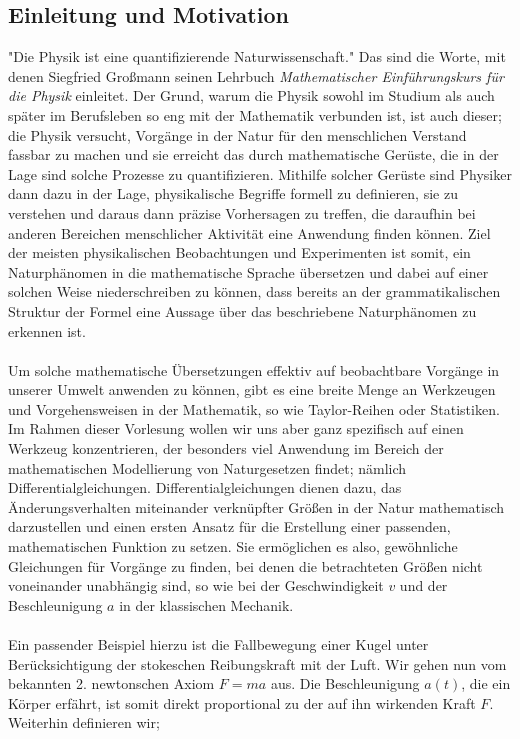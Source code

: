 \documentclass[a4paper,11pt]{article}
\theoremstyle{remark}
\begin{document}
\subsection{Einleitung und Motivation}
"Die Physik ist eine quantifizierende Naturwissenschaft." Das sind die Worte, mit denen Siegfried Großmann \cite{1} seinen Lehrbuch \textit{Mathematischer Einführungskurs für die Physik} einleitet. Der Grund, warum die Physik sowohl im Studium als auch später im Berufsleben so eng mit der Mathematik verbunden ist, ist auch dieser; die Physik versucht, Vorgänge in der Natur für den menschlichen Verstand fassbar zu machen und sie erreicht das durch mathematische Gerüste, die in der Lage sind solche Prozesse zu quantifizieren. Mithilfe solcher Gerüste sind Physiker dann dazu in der Lage, physikalische Begriffe formell zu definieren, sie zu verstehen und daraus dann präzise Vorhersagen zu treffen, die daraufhin bei anderen Bereichen menschlicher Aktivität eine Anwendung finden können. Ziel der meisten physikalischen Beobachtungen und Experimenten ist somit, ein Naturphänomen in die mathematische Sprache übersetzen und dabei auf einer solchen Weise niederschreiben zu können, dass bereits an der grammatikalischen Struktur der Formel eine Aussage über das beschriebene Naturphänomen zu erkennen ist. \\ \\ Um solche mathematische Übersetzungen effektiv auf beobachtbare Vorgänge in unserer Umwelt anwenden zu können, gibt es eine breite Menge an Werkzeugen und Vorgehensweisen in der Mathematik, so wie Taylor-Reihen oder Statistiken. Im Rahmen dieser Vorlesung wollen wir uns aber ganz spezifisch auf einen Werkzeug konzentrieren, der besonders viel Anwendung im Bereich der mathematischen Modellierung von Naturgesetzen findet; nämlich Differentialgleichungen. Differentialgleichungen dienen dazu, das Änderungsverhalten miteinander verknüpfter Größen in der Natur mathematisch darzustellen und einen ersten Ansatz für die Erstellung einer passenden, mathematischen Funktion zu setzen. Sie ermöglichen es also, gewöhnliche Gleichungen für Vorgänge zu finden, bei denen die betrachteten Größen nicht voneinander unabhängig sind, so wie bei der Geschwindigkeit $v$ und der Beschleunigung $a$ in der klassischen Mechanik. \\ \\ Ein passender Beispiel hierzu ist die Fallbewegung einer Kugel unter Berücksichtigung der stokeschen Reibungskraft mit der Luft. Wir gehen nun vom bekannten 2. newtonschen Axiom $F=ma$ aus. Die Beschleunigung $a(t)$, die ein Körper erfährt, ist somit direkt proportional zu der auf ihn wirkenden Kraft $F$. Weiterhin definieren wir; 
\end{document}
